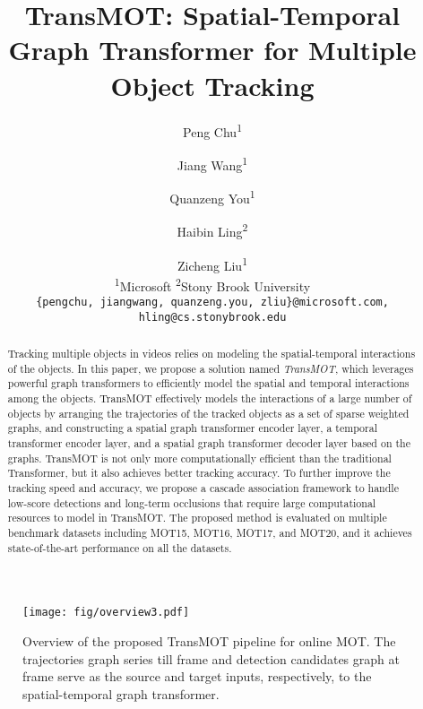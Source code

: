 \documentclass[10pt,twocolumn,letterpaper]{article}
\newcommand{\tb}{}
\begin{document}
\title{ TransMOT: Spatial-Temporal Graph Transformer for Multiple Object Tracking}

\author{
Peng Chu\textsuperscript{1}\and Jiang Wang\textsuperscript{1} \and Quanzeng You\textsuperscript{1}\and Haibin Ling\textsuperscript{2}\and Zicheng Liu\textsuperscript{1}\\
\small \textsuperscript{1}Microsoft \quad \textsuperscript{2}Stony Brook University\\
{\tt\small \{pengchu, jiangwang, quanzeng.you, zliu\}@microsoft.com, hling@cs.stonybrook.edu}
}

\maketitle
\ificcvfinal\thispagestyle{empty}\fi

\begin{abstract}
    Tracking multiple objects in videos relies on modeling the spatial-temporal interactions of the objects. 
    In this paper, we propose a solution named \emph{TransMOT}, which leverages powerful graph transformers to efficiently model the spatial and temporal interactions among the objects. TransMOT effectively models the interactions of a large number of objects by arranging the trajectories of the tracked objects as a set of sparse weighted graphs, and constructing a spatial graph transformer encoder layer, a temporal transformer encoder layer, and a spatial graph transformer decoder layer based on the graphs. TransMOT is not only more computationally efficient than the traditional Transformer, but it also achieves better tracking accuracy. To further improve the tracking speed and accuracy, we propose a cascade association framework to \tb{handle} low-score detections and long-term \tb{occlusions} that \tb{require} large computational resources to model in TransMOT. The proposed method is evaluated on multiple benchmark datasets including MOT15, MOT16, MOT17, and MOT20, and it achieves state-of-the-art performance on all the datasets.
\end{abstract}


\begin{figure*}[t]
	\centering
	\texttt{[image: fig/overview3.pdf]}
	\caption{Overview of the proposed TransMOT pipeline for online MOT. The trajectories graph series  till frame  and detection candidates graph  at frame  serve as the source and target inputs, respectively, to the spatial-temporal graph transformer.}
	\label{fig:overview}
\end{figure*}
\end{document}
